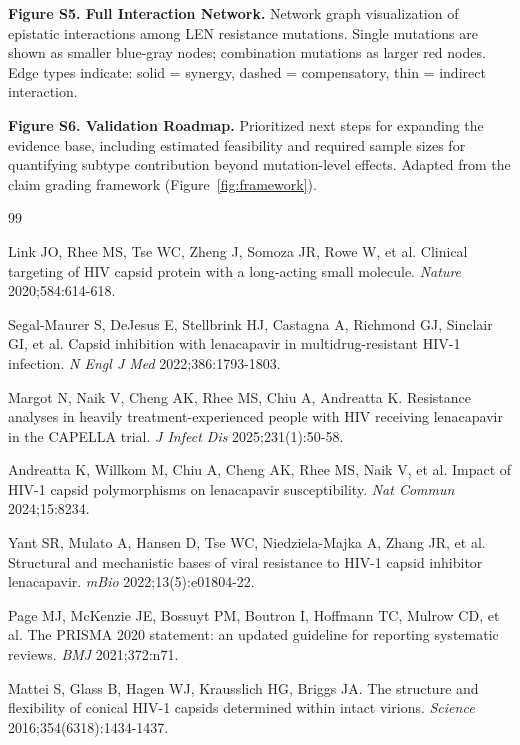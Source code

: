 \documentclass[12pt,a4paper]{article}
\begin{document}
\bigskip
\noindent\textbf{Figure S5. Full Interaction Network.}
Network graph visualization of epistatic interactions among LEN resistance mutations. Single mutations are shown as smaller blue-gray nodes; combination mutations as larger red nodes. Edge types indicate: solid = synergy, dashed = compensatory, thin = indirect interaction.

\bigskip
\noindent\textbf{Figure S6. Validation Roadmap.}
Prioritized next steps for expanding the evidence base, including estimated feasibility and required sample sizes for quantifying subtype contribution beyond mutation-level effects. Adapted from the claim grading framework (Figure~\ref{fig:framework}).

\begin{thebibliography}{99}

 Link JO, Rhee MS, Tse WC, Zheng J, Somoza JR, Rowe W, et al. Clinical targeting of HIV capsid protein with a long-acting small molecule. \textit{Nature} 2020;584:614-618.

 Segal-Maurer S, DeJesus E, Stellbrink HJ, Castagna A, Richmond GJ, Sinclair GI, et al. Capsid inhibition with lenacapavir in multidrug-resistant HIV-1 infection. \textit{N Engl J Med} 2022;386:1793-1803.

 Margot N, Naik V, Cheng AK, Rhee MS, Chiu A, Andreatta K. Resistance analyses in heavily treatment-experienced people with HIV receiving lenacapavir in the CAPELLA trial. \textit{J Infect Dis} 2025;231(1):50-58.

 Andreatta K, Willkom M, Chiu A, Cheng AK, Rhee MS, Naik V, et al. Impact of HIV-1 capsid polymorphisms on lenacapavir susceptibility. \textit{Nat Commun} 2024;15:8234.

 Yant SR, Mulato A, Hansen D, Tse WC, Niedziela-Majka A, Zhang JR, et al. Structural and mechanistic bases of viral resistance to HIV-1 capsid inhibitor lenacapavir. \textit{mBio} 2022;13(5):e01804-22.

 Page MJ, McKenzie JE, Bossuyt PM, Boutron I, Hoffmann TC, Mulrow CD, et al. The PRISMA 2020 statement: an updated guideline for reporting systematic reviews. \textit{BMJ} 2021;372:n71.

 Mattei S, Glass B, Hagen WJ, Krausslich HG, Briggs JA. The structure and flexibility of conical HIV-1 capsids determined within intact virions. \textit{Science} 2016;354(6318):1434-1437.



\end{thebibliography}
\end{document}
